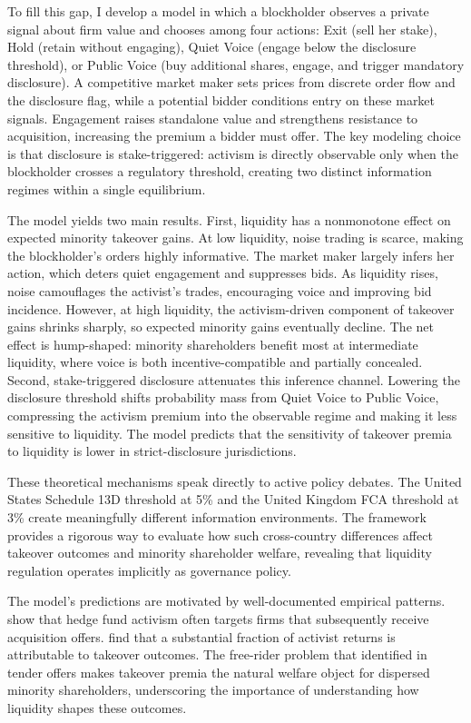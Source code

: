 \documentclass[11pt]{article}
\newcommand{\1}{\mathbf{1}}
\begin{document}
To fill this gap, I develop a model in which a blockholder observes a private signal about firm value and chooses among four actions: Exit (sell her stake), Hold (retain without engaging), Quiet Voice (engage below the disclosure threshold), or Public Voice (buy additional shares, engage, and trigger mandatory disclosure). A competitive market maker sets prices from discrete order flow and the disclosure flag, while a potential bidder conditions entry on these market signals. Engagement raises standalone value and strengthens resistance to acquisition, increasing the premium a bidder must offer. The key modeling choice is that disclosure is stake-triggered: activism is directly observable only when the blockholder crosses a regulatory threshold, creating two distinct information regimes within a single equilibrium.

The model yields two main results. First, liquidity has a nonmonotone effect on expected minority takeover gains. At low liquidity, noise trading is scarce, making the blockholder's orders highly informative. The market maker largely infers her action, which deters quiet engagement and suppresses bids. As liquidity rises, noise camouflages the activist's trades, encouraging voice and improving bid incidence. However, at high liquidity, the activism-driven component of takeover gains shrinks sharply, so expected minority gains eventually decline. The net effect is hump-shaped: minority shareholders benefit most at intermediate liquidity, where voice is both incentive-compatible and partially concealed. Second, stake-triggered disclosure attenuates this inference channel. Lowering the disclosure threshold shifts probability mass from Quiet Voice to Public Voice, compressing the activism premium into the observable regime and making it less sensitive to liquidity. The model predicts that the sensitivity of takeover premia to liquidity is lower in strict-disclosure jurisdictions.

These theoretical mechanisms speak directly to active policy debates. The United States Schedule 13D threshold at 5\% and the United Kingdom FCA threshold at 3\% create meaningfully different information environments. The framework provides a rigorous way to evaluate how such cross-country differences affect takeover outcomes and minority shareholder welfare, revealing that liquidity regulation operates implicitly as governance policy.

The model's predictions are motivated by well-documented empirical patterns. \citet{BravJiangPartnoyThomas2008} show that hedge fund activism often targets firms that subsequently receive acquisition offers. \citet{GreenwoodSchor2009} find that a substantial fraction of activist returns is attributable to takeover outcomes. The free-rider problem that \citet{GrossmanHart1980} identified in tender offers makes takeover premia the natural welfare object for dispersed minority shareholders, underscoring the importance of understanding how liquidity shapes these outcomes.
\end{document}
